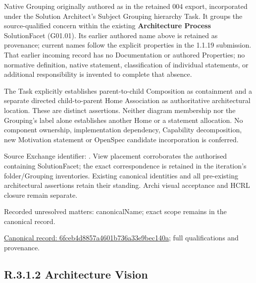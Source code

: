 Native Grouping originally authored as \texttt{} in the retained 004 export,
incorporated under the Solution Architect's Subject Grouping hierarchy Task.
It groups the source-qualified \texttt{} concern within
the existing \textbf{Architecture Process} SolutionFacet (G01.01). Its earlier authored name above is retained as provenance; current names
follow the explicit properties in the 1.1.19 submission.
That earlier incoming record has no Documentation or authored Properties; no normative
definition, native statement, classification of individual statements, or
additional responsibility is invented to complete that absence.



The Task explicitly establishes parent-to-child Composition as containment and
a separate directed child-to-parent Home Association as authoritative architectural
location. These are distinct assertions. Neither diagram membership nor the
Grouping's label alone establishes another Home or a statement allocation.
No component ownership, implementation dependency, Capability decomposition,
new Motivation statement or OpenSpec candidate incorporation is conferred.



Source Exchange identifier: \texttt{}. View placement corroborates
the authorised containing SolutionFacet; the exact correspondence is retained in the
iteration's folder/Grouping inventories. Existing canonical identities and all
pre-existing architectural assertions retain their standing. Archi visual
acceptance and HCRL closure remain separate.


{\small Recorded unresolved matters: canonicalName; exact scope remains in the canonical record.}\par
{\footnotesize \href{../../../../../../../continuum/grouping/6fceb4d8857a4601b736a33e9bec140a.md}{Canonical record: 6fceb4d8857a4601b736a33e9bec140a}; full qualifications and provenance.}\par
\subsection*{R.3.1.2 Architecture Vision}
\label{navigation:R.3.1.2}

